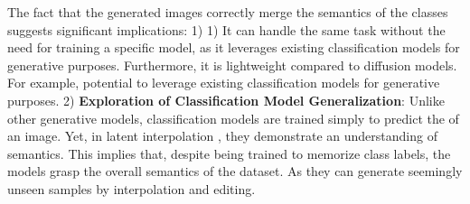 The fact that the generated images correctly merge the semantics of the classes suggests  significant implications: 1)  1)  It can handle the same task without the need for training a specific model, as it leverages existing classification models for generative purposes. Furthermore, it is lightweight compared to diffusion models.
For example,  potential to leverage existing classification models for generative purposes. 2)  \textbf{Exploration of Classification Model Generalization}: Unlike other generative models, classification models are trained simply to predict the  of an image. Yet, in latent interpolation , they demonstrate an understanding of semantics. This implies that, despite being trained to memorize class labels, the models grasp the overall semantics of the dataset. As they can generate seemingly unseen samples by interpolation and editing.




